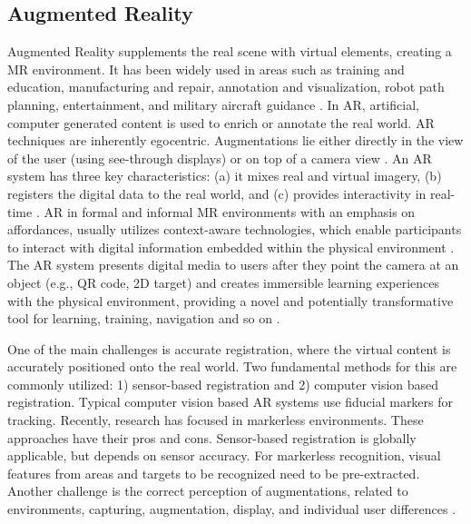 \subsection{Augmented Reality}
Augmented Reality supplements the real scene with virtual elements, creating a MR environment. It has been widely used in areas such as training and education, manufacturing and repair, annotation and visualization, robot path planning, entertainment, and military aircraft guidance \cite{Krevelen2010}.
In AR, artificial, computer generated content is used to enrich or annotate the real world. AR techniques are inherently egocentric. Augmentations lie either directly in the view of the user (using see-through displays) or on top of a camera view \cite{Karimi2004}. 
An AR system has three key characteristics: (a) it mixes real and virtual imagery, (b) registers the digital data to the real world, and (c) provides interactivity in real-time \cite{Azuma1997a}. AR in formal and informal MR environments with an emphasis on affordances, usually utilizes context-aware technologies, which enable participants to interact with digital information embedded within the physical environment \cite{Dunleavy2008}. The AR system presents digital media to users after they point the camera at an object (e.g., QR code, 2D target) and creates immersible learning experiences with the physical environment, providing a novel and potentially transformative tool for learning, training, navigation and so on \cite{Dede2009,Johnson2011}.

One of the main challenges is accurate registration, where the virtual content is accurately positioned onto the real world. Two fundamental methods for this are commonly utilized: 1) sensor-based registration and 2) computer vision based registration. 
Typical computer vision based AR systems use fiducial markers for tracking. Recently, research has focused in markerless environments. These approaches have their pros and cons. Sensor-based registration is globally applicable, but depends on sensor accuracy. For markerless recognition, visual features from areas and targets to be recognized need to be pre-extracted. 
Another challenge is the correct perception of augmentations, related to environments, capturing, augmentation, display, and individual user differences  \cite{Kruijff2010}.
 


